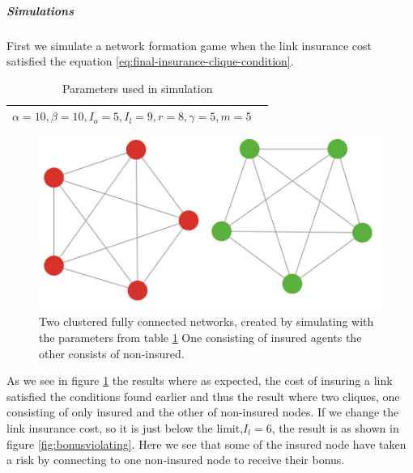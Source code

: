 \subparagraph{Simulations}
First we simulate a network formation game when the link insurance cost satisfied the equation \ref{eq:final-insurance-clique-condition}. 
\begin{table}[h]
\centering
\begin{tabular}{lc}
 \hline
  $\alpha=10,
  \beta=10,
  I_{o}=5,
  I_{l}=9,
  r=8,
  \gamma=5,
  m=5
  $
  \\
  \hline
\end{tabular}
\caption{Parameters used in simulation \label{tbl:maxdegrevalues}}
\end{table}
\begin{figure}[h]
\centering
  \includegraphics[width=0.8\linewidth]{../Figures/BonusGameInsuredClique.png}
  \caption{\label{fig:bonusoptimal} Two clustered fully connected networks, created by simulating with the parameters from table \ref{tbl:maxdegrevalues} One consisting of insured agents the other consists of non-insured. }
\end{figure}
As we see in figure \ref{fig:bonusoptimal} the results where as expected, the cost of insuring a link satisfied the conditions found earlier and thus the result where two cliques, one consisting of only insured and the other of non-insured nodes.
If we change the link insurance cost, so it is just below the limit,$I_{l}=6$, the result is as shown in figure \ref{fig:bonusviolating}. Here we see that some of the insured node have taken a risk by connecting to one non-insured node to receive their bonus.  
